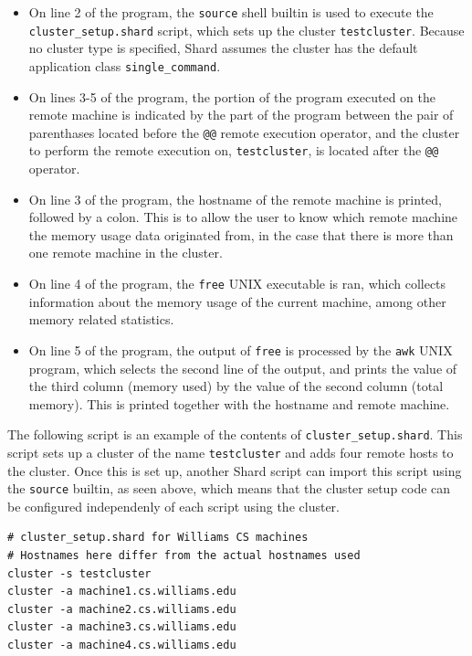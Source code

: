 \documentclass[twoside]{report}
\begin{document}
\begin{itemize}
  \item On line 2 of the program, the \texttt{source} shell builtin is used to execute the \texttt{cluster\_setup.shard} script, which sets up the cluster \texttt{testcluster}.
        Because no cluster type is specified, Shard assumes the cluster has the default application class \texttt{single\_command}.
  \item On lines 3-5 of the program, the portion of the program executed on the remote machine is indicated by the part of the program between the pair of parenthases located before the \texttt{@@} remote execution operator, and the cluster to perform the remote execution on, \texttt{testcluster}, is located after the \texttt{@@} operator.
  \item On line 3 of the program, the hostname of the remote machine is printed, followed by a colon. This is to allow the user to know which remote machine the memory usage data originated from, in the case that there is more than one remote machine in the cluster.
  \item On line 4 of the program, the \texttt{free} UNIX executable is ran, which collects information about the memory usage of the current machine, among other memory related statistics.
  \item On line 5 of the program, the output of \texttt{free} is processed by the \texttt{awk} UNIX program, which selects the second line of the output, and prints the value of the third column (memory used) by the value of the second column (total memory). This is printed together with the hostname and remote machine.
\end{itemize}

The following script is an example of the contents of \texttt{cluster\_setup.shard}.
This script sets up a cluster of the name \texttt{testcluster} and adds four remote hosts to the cluster.
Once this is set up, another Shard script can import this script using the \texttt{source} builtin, as seen above, which means that the cluster setup code can be configured independenly of each script using the cluster.

\begin{minipage}[c]{\textwidth-15pt}
  \begin{lstlisting}[language=Shard]
# cluster_setup.shard for Williams CS machines
# Hostnames here differ from the actual hostnames used
cluster -s testcluster
cluster -a machine1.cs.williams.edu
cluster -a machine2.cs.williams.edu
cluster -a machine3.cs.williams.edu
cluster -a machine4.cs.williams.edu
\end{lstlisting}
  \smallskip
\end{minipage}
\end{document}
